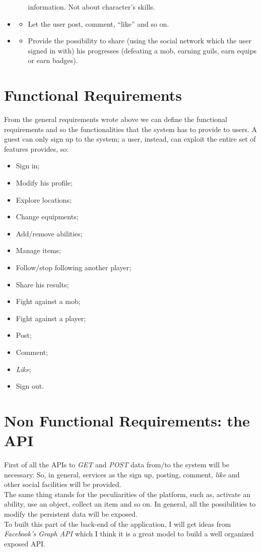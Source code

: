 \begin{itemize}
\begin{itemize}
				information. Not about character's skills.
			\end{itemize}
		\item \textbf{\goalSocial}
			\begin{itemize}
				\item Let the user post, comment, ``like'' and so on.
			\end{itemize}
		\item \textbf{\goalShare}
			\begin{itemize}
				\item Provide the possibility to share (using the social network which the user signed in with) his 
				progresses (defeating a mob, earning guils, earn equips or earn badges).
			\end{itemize}
	\end{itemize}

	\section{Functional Requirements}
		From the general requirements wrote above we can define the functional requirements 
		and so the functionalities that the system has to provide to users. A guest can only sign up to the system; 
		a user, instead, can exploit the entire set of features provides, so:
		\begin{itemize}
			\item Sign in;
			\item Modify his profile;
			\item Explore locations;
			\item Change equipments;
			\item Add/remove abilities;
			\item Manage items;
			\item Follow/stop following another player;
			\item Share his results;
			\item Fight against a mob;
			\item Fight against a player;
			\item Post;
			\item Comment;
			\item \textit{Like};
			\item Sign out.
		\end{itemize}
	\section{Non Functional Requirements: the API}
		First of all the APIs to \textit{GET} and \textit{POST} data from/to the system will be necessary. So, in general, 
		services as the sign up, posting, comment, \textit{like} and other social facilities will be provided.\\
		The same thing stands for the peculiarities of the platform, such as, activate an ability, use an object, collect an item and so on. In general, all the possibilities to modify the persistent data will be exposed.\\
		To built this part of the back-end of the application, I will get ideas from \textit{Facebook's Graph API} which I think it is a great model to build a well organized exposed API.

